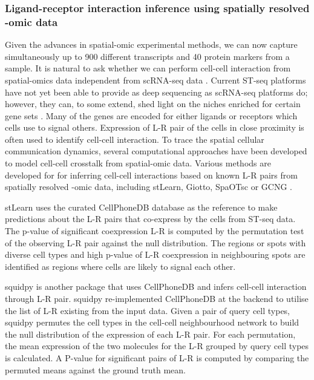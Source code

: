 \subsubsection{Ligand-receptor interaction inference using spatially resolved -omic data}
Given the advances in spatial-omic experimental methods, we can now capture simultaneously up to 900 different transcripts and 40 protein markers from a sample. It is natural to ask whether we can perform cell-cell interaction from spatial-omics data independent from scRNA-seq data \cite{moses2022museum}. Current ST-seq platforms have not yet been able to provide as deep sequencing as scRNA-seq platforms do; however, they can, to some extend, shed light on the niches enriched for certain gene sets \cite{Bost2022Optimizing}. Many of the genes are encoded for either ligands or receptors which cells use to signal others. Expression of L-R pair of the cells in close proximity is often used to identify cell-cell interaction. To trace the spatial cellular communication dynamics, several computational approaches have been developed to model cell-cell crosstalk from spatial-omic data. Various methods are developed for for inferring cell-cell interactions based on known L-R pairs from spatially resolved -omic data, including stLearn, Giotto, SpaOTsc or GCNG \cite{pham2020stlearn, dries2021giotto, cang2020inferring, yuan2020gcng}.  

stLearn \cite{pham2020stlearn} uses the curated CellPhoneDB database \cite{efremova2020cellphonedb} as the reference to make predictions about the L-R pairs that co-express by the cells from ST-seq data. The p-value of significant coexpression L-R is computed by the permutation test of the observing L-R pair against the null distribution. The regions or spots with diverse cell types and high p-value of L-R coexpression in neighbouring spots are identified as regions where cells are likely to signal each other. 

squidpy \cite{palla2022squidpy} is another package that uses CellPhoneDB and infers cell-cell interaction through L-R pair. squidpy re-implemented CellPhoneDB at the backend to utilise the list of L-R existing from the input data. Given a pair of query cell types, squidpy permutes the cell types in the cell-cell neighbourhood network to build the null distribution of the expression of each L-R pair. For each permutation, the mean expression of the two molecules for the L-R grouped by query cell types is calculated. A P-value for significant pairs of L-R is computed by comparing the permuted means against the ground truth mean.

